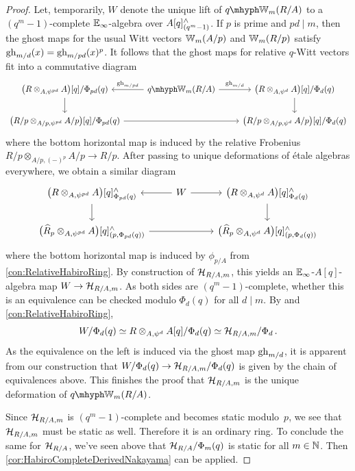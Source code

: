 \documentclass[DIV=12,numbers=enddot,leqno,bibliography=totoc]{scrartcl}
\begin{document}
	\begin{proof}
		Let, temporarily, $W$ denote the unique lift of $\qIW_m(R/A)$ to a $(q^m-1)$-complete $\mathbb{E}_\infty$-algebra over $A[q]_{(q^m-1)}^\wedge$. If $p$ is prime and $pd\mid m$, then the ghost maps for the usual Witt vectors $\mathbb{W}_m(A/p)$ and $\mathbb{W}_m(R/p)$ satisfy $\operatorname{gh}_{m/d}(x)=\operatorname{gh}_{m/pd}(x)^p$. It follows that the ghost maps for relative $q$-Witt vectors fit into a commutative diagram
		\begin{equation*}
			\begin{tikzcd}
				\left(R\otimes_{A,\psi^{pd}}A\right)[q]/\Phi_{pd}(q)\dar & \qIW_m(R/A) \lar["\gh_{m/pd}"']\rar["\gh_{m/d}"] & \left(R\otimes_{A,\psi^d}A\right)[q]/\Phi_d(q)\dar\\
				\bigl(R/p\otimes_{A/p,\psi^{pd}}A/p\bigr)[q]/\Phi_{pd}(q)\ar[rr] & & \bigl(R/p\otimes_{A/p,\psi^d}A/p\bigr)[q]/\Phi_d(q)
			\end{tikzcd}
		\end{equation*}
		where the bottom horizontal map is induced by the relative Frobenius $R/p\otimes_{A/p,(-)^p}A/p\rightarrow R/p$. After passing to unique deformations of étale algebras everywhere, we obtain a similar diagram
		\begin{equation*}
			\begin{tikzcd}
				\left(R\otimes_{A,\psi^{pd}}A\right)[q]_{\Phi_{pd}(q)}^\complete\dar & W\lar\rar& \left(R\otimes_{A,\psi^d}A\right)[q]_{\Phi_d(q)}^\complete\dar\\
				\bigl(\widehat{R}_p\otimes_{A,\psi^{pd}}A\bigr)[q]_{(p,\Phi_{pd}(q))}^\complete\ar[rr]& & \bigl(\widehat{R}_p\otimes_{A,\psi^d}A\bigr)[q]_{(p,\Phi_d(q))}^\complete
			\end{tikzcd}
		\end{equation*}
		where the bottom horizontal map is induced by $\phi_{p/A}$ from \cref{con:RelativeHabiroRing}. By construction of $\mathcal{H}_{R/A,  m}$, this yields an $\mathbb{E}_\infty$-$A[q]$-algebra map $W\rightarrow \mathcal{H}_{R/A,  m}$. As both sides are $(q^m-1)$-complete, whether this is an equivalence can be checked modulo $\Phi_d(q)$ for all $d\mid m$. By \cite[Corollary~]{qWitt} and \cref{con:RelativeHabiroRing},
		\begin{equation*}
			W/\Phi_d(q)\simeq R\otimes_{A,\psi^d}A[q]/\Phi_d(q)\simeq \mathcal{H}_{R/A,  m}/\Phi_d\,.
		\end{equation*}
		As the equivalence on the left is induced via the ghost map $\operatorname{gh}_{m/d}$, it is apparent from our construction that $W/\Phi_d(q)\rightarrow \mathcal{H}_{R/A,  m}/\Phi_d(q)$ is given by the chain of equivalences above. This finishes the proof that $\mathcal{H}_{R/A,  m}$ is the unique deformation of $\qIW_m(R/A)$. 
		
		Since $\mathcal{H}_{R/A,  m}$ is $(q^m-1)$-complete and becomes static modulo~$p$, we see that $\mathcal{H}_{R/A,  m}$ must be static as well. Therefore it is an ordinary ring. To conclude the same for $\mathcal{H}_{R/A}$, we've seen above that $\mathcal{H}_{R/A}/\Phi_m(q)$ is static for all $m\in\mathbb{N}$. Then \cref{cor:HabiroCompleteDerivedNakayama} can be applied.
	\end{proof}
\end{document}
